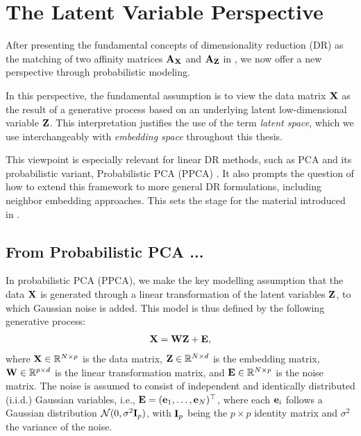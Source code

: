 \section{The Latent Variable Perspective}\label{sec:dr_proba_modelling}

After presenting the fundamental concepts of dimensionality reduction (DR) as the matching of two affinity matrices ${\mathbf{A}}_{{\mathbf{X}}}$ and ${\mathbf{A}}_{{\mathbf{Z}}}$ in , we now offer a new perspective through probabilistic modeling.

In this perspective, the fundamental assumption is to view the data matrix ${\mathbf{X}}$ as the result of a generative process based on an underlying latent low-dimensional variable ${\mathbf{Z}}$. This interpretation justifies the use of the term \emph{latent space}, which we use interchangeably with \emph{embedding space} throughout this thesis.

This viewpoint is especially relevant for linear DR methods, such as PCA and its probabilistic variant, Probabilistic PCA (PPCA) \citep{tipping1999probabilistic}. It also prompts the question of how to extend this framework to more general DR formulations, including neighbor embedding approaches. This sets the stage for the material introduced in .

\subsection{From Probabilistic PCA ...}\label{sec:ppca}

In probabilistic PCA (PPCA), we make the key modelling assumption that the data ${\mathbf{X}}$ is generated through a linear transformation of the latent variables ${\mathbf{Z}}$, to which Gaussian noise is added. This model is thus defined by the following generative process:
\begin{align}
    {\mathbf{X}} = {\mathbf{W}} {\mathbf{Z}} + {\mathbf{E}},
\end{align}
where ${\mathbf{X}} \in \mathbb{R}^{N \times p}$ is the data matrix, ${\mathbf{Z}} \in \mathbb{R}^{N \times d}$ is the embedding matrix, ${\mathbf{W}} \in \mathbb{R}^{p \times d}$ is the linear transformation matrix, and ${\mathbf{E}} \in \mathbb{R}^{N \times p}$ is the noise matrix. The noise is assumed to consist of independent and identically distributed (i.i.d.) Gaussian variables, i.e., ${\mathbf{E}} = ({\mathbf{e}}_1, \ldots, {\mathbf{e}}_N)^\top$, where each ${\mathbf{e}}_i$ follows a Gaussian distribution $\mathcal{N}(0, \sigma^2 {\mathbf{I}}_p)$, with ${\mathbf{I}}_p$ being the $p \times p$ identity matrix and $\sigma^2$ the variance of the noise.

